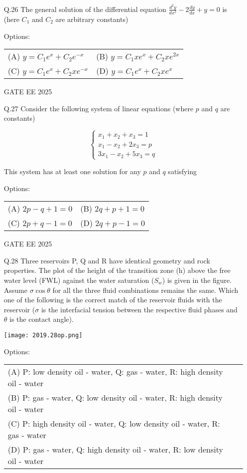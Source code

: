 \documentclass{article}
\begin{document}
\begin{enumerate}[resume*=q]
\item[Q.26] The general solution of the differential equation $\frac{d^2 y}{dx^2} - 2 \frac{dy}{dx} + y = 0$ is (here $C_1$ and $C_2$ are arbitrary constants)

Options:
\begin{tabular}{ll}
(A) $y = C_1 e^x + C_2 e^{-x}$ & (B) $y = C_1 xe^x + C_2 xe^{2x}$ \\
(C) $y = C_1 e^x + C_2 xe^{-x}$ & (D) $y = C_1 e^x + C_2 xe^x$
\end{tabular}

GATE EE 2025
 \vspace{0.5cm} 
\item[Q.27] Consider the following system of linear equations (where $p$ and $q$ are constants)

\[
\begin{cases}
x_1 + x_2 + x_3 = 1 \\
x_1 - x_2 + 2x_3 = p \\
3x_1 - x_2 + 5x_3 = q
\end{cases}
\]

This system has at least one solution for any $p$ and $q$ satisfying

Options:
\begin{tabular}{ll}
(A) $2p - q + 1 = 0$ & (B) $2q + p + 1 = 0$ \\
(C) $2p + q - 1 = 0$ & (D) $2q + p - 1 = 0$
\end{tabular}

GATE EE 2025
 \vspace{0.5cm} 
\item[Q.28] Three reservoirs P, Q and R have identical geometry and rock properties. The plot of the height of the transition zone (h) above the free water level (FWL) against the water saturation ($S_w$) is given in the figure. Assume $\sigma \cos \theta$ for all the three fluid combinations remains the same. Which one of the following is the correct match of the reservoir fluids with the reservoir ($\sigma$ is the interfacial tension between the respective fluid phases and $\theta$ is the contact angle).

\begin{center}
\texttt{[image: 2019.28op.png]}
\end{center}

Options:
\begin{tabular}{ll}
(A) P: low density oil - water, Q: gas - water, R: high density oil - water \\
(B) P: gas - water, Q: low density oil - water, R: high density oil - water \\
(C) P: high density oil - water, Q: low density oil - water, R: gas - water \\
(D) P: gas - water, Q: high density oil - water, R: low density oil - water
\end{tabular}


\end{enumerate}
\end{document}

